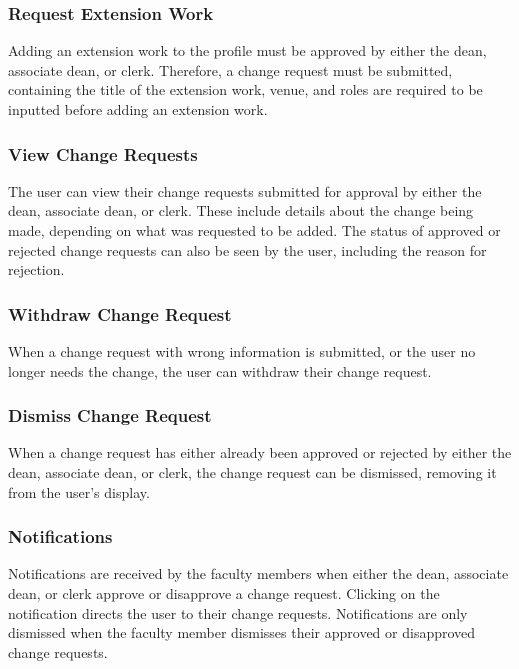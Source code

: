        \subsubsection{Request Extension Work}
        Adding an extension work to the profile must be approved by either the dean, associate dean, or clerk. Therefore, a change request must be submitted, containing the title of the extension work, venue, and roles are required to be inputted before adding an extension work.
        
        \subsubsection{View Change Requests}
        The user can view their change requests submitted for approval by either the dean, associate dean, or clerk. These include details about the change being made, depending on what was requested to be added. The status of approved or rejected change requests can also be seen by the user, including the reason for rejection.
        
        \subsubsection{Withdraw Change Request}
        When a change request with wrong information is submitted, or the user no longer needs the change, the user can withdraw their change request.
        
        \subsubsection{Dismiss Change Request}
        When a change request has either already been approved or rejected by either the dean, associate dean, or clerk, the change request can be dismissed, removing it from the user's display.
        
        \subsubsection{Notifications}
        Notifications are received by the faculty members when either the dean, associate dean, or clerk approve or disapprove a change request. Clicking on the notification directs the user to their change requests. Notifications are only dismissed when the faculty member dismisses their approved or disapproved change requests.
    
